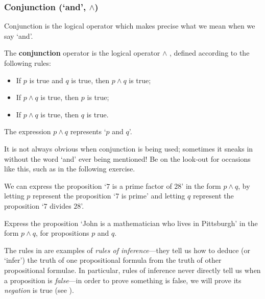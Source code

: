 \subsubsection*{Conjunction (`and', $\wedge$)}

Conjunction is the logical operator which makes precise what we mean when we say `and'.

\begin{idefinition}
\label{defConjunction}
The \textbf{conjunction} operator is the logical operator $\wedge$ , defined according to the following rules:
\begin{itemize}
\item \introrule{\wedge} If $p$ is true and $q$ is true, then $p \wedge q$ is true;
\item {} If $p \wedge q$ is true, then $p$ is true;
\item {} If $p \wedge q$ is true, then $q$ is true.
\end{itemize}
The expression $p \wedge q$ represents `$p$ and $q$'.
\end{idefinition}

It is not always obvious when conjunction is being used; sometimes it sneaks in without the word `and' ever being mentioned! Be on the look-out for occasions like this, such as in the following exercise.

\begin{example}
\label{exSevenDividesTwentyEightConjunction}
We can express the proposition `$7$ is a prime factor of $28$' in the form $p \wedge q$, by letting $p$ represent the proposition `$7$ is prime' and letting $q$ represent the proposition `$7$ divides $28$'.
\end{example}

\begin{exercise}
\label{exJohnMathematicianPittsburgh}
Express the proposition `John is a mathematician who lives in Pittsburgh' in the form $p \wedge q$, for propositions $p$ and $q$.
\end{exercise}

The rules in  are examples of \textit{rules of inference}---they tell us how to deduce (or `infer') the truth of one propositional formula from the truth of other propositional formulae. In particular, rules of inference never directly tell us when a proposition is \textit{false}---in order to prove something is false, we will prove its \textit{negation} is true (see ).

